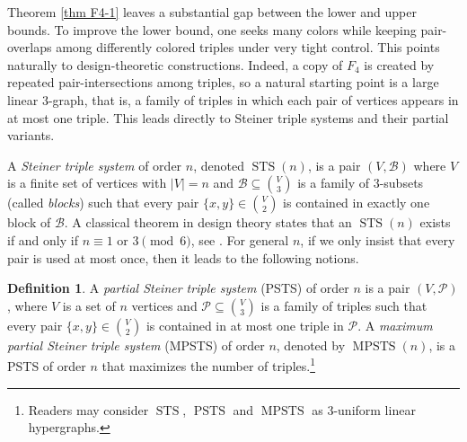 \documentclass[10pt,a4paper]{article}
\theoremstyle{definition}
\newtheorem{definition}[theorem]{Definition}
\DeclareMathOperator{\STS}{STS}
\DeclareMathOperator{\PSTS}{PSTS}
\DeclareMathOperator{\MPSTS}{MPSTS}
\begin{document}
Theorem \ref{thm F4-1} leaves a substantial gap between the lower and upper bounds.
To improve the lower bound, one seeks many colors while keeping pair-overlaps among differently colored triples under very tight control.
This points naturally to design-theoretic constructions.
Indeed, a copy of \(F_4\) is created by repeated pair-intersections among triples, so a natural starting point is a large linear \(3\)-graph, that is, a family of triples in which each pair of vertices appears in at most one triple.
This leads directly to Steiner triple systems and their partial variants.



A {\it Steiner triple system} of order $n$, denoted $\STS(n)$, is a pair $(V,\mathcal B)$ where $V$ is a finite set of vertices with $|V|=n$ and $\mathcal B\subseteq \binom{V}{3}$ is a family of $3$-subsets (called {\it blocks}) such that every pair $\{x,y\}\in\binom{V}{2}$ is contained in exactly one block of $\mathcal B$.
A classical theorem in design theory states that an $\STS(n)$ exists if and only if $n\equiv 1$ or $3 \pmod 6$, see \cite{kirkman}.
For general $n$, if we only insist that every pair is used at most once, then it leads to the following notions.
\begin{definition}\label{def:max-psts}
    A {\it partial Steiner triple system} (PSTS) of order $n$ is a pair $(V,\mathcal P)$, where $V$ is a set of $n$ vertices and $\mathcal P\subseteq \binom{V}{3}$ is a family of triples such that every pair $\{x,y\}\in\binom{V}{2}$ is contained in at most one triple in $\mathcal P$.
    A {\it maximum partial Steiner triple system} (MPSTS) of order \(n\), denoted by \(\MPSTS(n)\), is a PSTS of order \(n\) that maximizes the number of triples.\footnote{Readers may consider $\STS$, $\PSTS$ and $\MPSTS$ as $3$-uniform linear hypergraphs.}
\end{definition}
\end{document}
